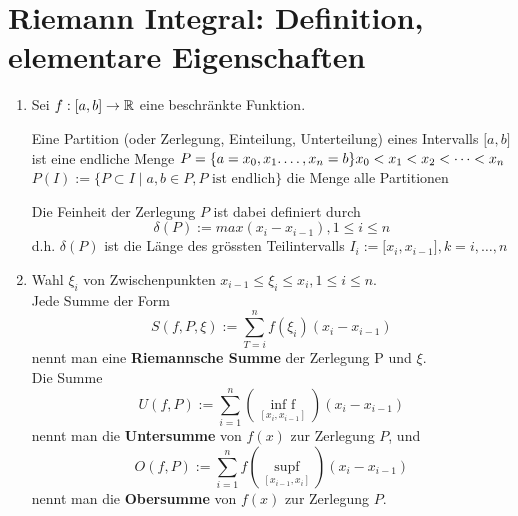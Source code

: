\section{Riemann Integral: Definition, elementare Eigenschaften}
\begin{enumerate}
\item Sei $f: \lbrack a,b\rbrack\to\mathbb{R}$ eine beschränkte Funktion.\\

\begin{definition}{6.1}
Eine Partition (oder Zerlegung, Einteilung, Unterteilung) eines Intervalls $\lbrack a,b\rbrack$ ist eine endliche Menge $P=\{a=x_0,x_1.\dots,x_n=b \}\\
x_0 < x_1 < x_2 < \dots < x_n$ \\
$P(I):=\{P\subset I \mid a,b\in P, P \text{ ist endlich}\}$ die Menge alle Partitionen \begin{center}
\end{center}
\end{definition}

Die Feinheit der Zerlegung $P$ ist dabei definiert durch \[\delta (P):=max(x_i - x_{i-1}), 1\leq i \leq n\] d.h. $\delta (P)$ ist die Länge des grössten Teilintervalls $I_i:=\lbrack x_i,x_{i-1}\rbrack , k=i,\dots,n$

\item Wahl $\xi_i$ von Zwischenpunkten  $x_{i-1} \leq \xi_i  \leq x_i, 1\leq i \leq n$.\\
Jede Summe der Form \[S(f,P,\xi):=\sum\limits_{T = i}^n {f({\xi _i})} ({x_i} - {x_{i - 1}})\] nennt man eine \textbf{Riemannsche Summe} der Zerlegung P und $\xi$.\\
Die Summe \[U(f,P):=\sum\limits_{i = 1}^n {(\mathop {{\text{inf }}f}\limits_{[{x_i},{x_{i - 1}}]} )} ({x_i} - {x_{i - 1}})\] nennt man die \textbf{Untersumme} von $f(x)$ zur Zerlegung $P$, und \[O(f,P):=\sum\limits_{i = 1}^n {f(\mathop {{\text{sup}}f}\limits_{[{x_{i - 1}},{x_{i}}]} )} ({x_i} - {x_{i - 1}})\] nennt man die \textbf{Obersumme} von $f(x)$ zur Zerlegung $P$.


\end{enumerate}
